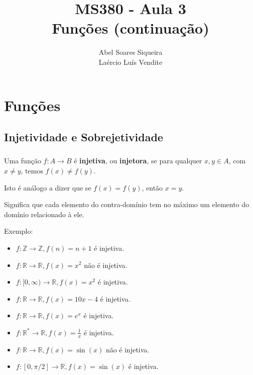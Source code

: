 \documentclass[10 pt]{beamer}
\title{ MS380 - Aula 3 \\
Funções (continuação)}
\author{Abel Soares Siqueira \\
Laércio Luís Vendite}
\date{}
\newcommand{\makesection}[1]{\section[#1]{#1}}
\newcommand{\makesubsection}[1]{\subsection[#1]{#1}}
\newcommand{\myframe}[1]{
\begin{frame}
 \frametitle{\insertsection \qquad {\small \insertsubsection}}
#1
\end{frame}}
\begin{document}
\begin{frame}
 \titlepage
\end{frame}

\newcommand{\boxat}[4]{
  \draw[color=gray] (#1-0.5,#2-0.5) -- (#1+#3+0.5,#2-0.5) -- 
    (#1+#3+0.5,#2+#4+0.5) -- (#1-0.5,#2+#4+0.5) -- (#1-0.5,#2-0.5);}
\newcommand{\seta}[2]{ \draw[->] #1 -- #2}
\newcommand{\setaemph}[2]{ \draw[thick,color=red,->] #1 -- #2}
\makesection{Funções}

\makesubsection{Injetividade e Sobrejetividade}

\myframe {
  Uma função $f:A\rightarrow B$ é {\bf injetiva}, ou {\bf injetora}, se
  para qualquer $x,y\in A$, com $x \neq y$, 
  temos $f(x) \neq f(y)$.

  Isto é análogo a dizer que se $f(x) = f(y)$,
  então $x = y$.

  Significa que cada elemento do contra-domínio tem no máximo
  um elemento do domínio relacionado à ele.

  Exemplo:
  \begin{itemize}
    \item $f:\mathbb{Z}\rightarrow\mathbb{Z}, f(n) = n + 1$ é injetiva.
    \item $f:\mathbb{R}\rightarrow\mathbb{R}, f(x) = x^2$ não é injetiva.
    \item $f:[0,\infty)\rightarrow\mathbb{R}, f(x) = x^2$ é injetiva.
    \item $f:\mathbb{R}\rightarrow\mathbb{R}, f(x) = 10x - 4$ é injetiva.
    \item $f:\mathbb{R}\rightarrow\mathbb{R}, f(x) = e^x$ é injetiva.
    \item $f:\mathbb{R}^*\rightarrow\mathbb{R}, f(x) = \frac{1}{x}$ é injetiva.
    \item $f:\mathbb{R}\rightarrow\mathbb{R}, f(x) = \sin(x)$ não é injetiva.
    \item $f:[0,\pi/2]\rightarrow\mathbb{R}, f(x) = \sin(x)$ é injetiva.
  \end{itemize}
}
\end{document}

